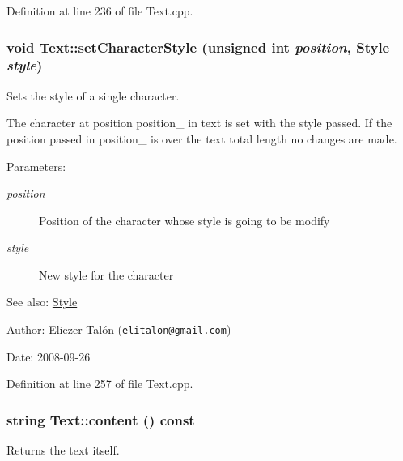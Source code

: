 Definition at line 236 of file Text.cpp.\hypertarget{class_text_7cf2efca7fdd4d7b04292e373d5c2e5e}{
\subsubsection[setCharacterStyle]{\setlength{\rightskip}{0pt plus 5cm}void Text::setCharacterStyle (unsigned int {\em position}, \/  {\bf Style} {\em style})}}
\label{class_text_7cf2efca7fdd4d7b04292e373d5c2e5e}


Sets the style of a single character. 

The character at position position\_\- in text is set with the style passed. If the position passed in position\_\- is over the text total length no changes are made.

\begin{Desc}
\item[Parameters:]
\begin{description}
\item[{\em position}]Position of the character whose style is going to be modify \item[{\em style}]New style for the character\end{description}
\end{Desc}
\begin{Desc}
\item[See also:]\hyperlink{class_style}{Style}\end{Desc}
\begin{Desc}
\item[Author:]Eliezer Talón (\href{mailto:elitalon@gmail.com}{\tt elitalon@gmail.com}) \end{Desc}
\begin{Desc}
\item[Date:]2008-09-26 \end{Desc}


Definition at line 257 of file Text.cpp.\hypertarget{class_text_8a29bbf6c707ac8b2055a22723a82f3d}{
\subsubsection[content]{\setlength{\rightskip}{0pt plus 5cm}string Text::content () const}}
\label{class_text_8a29bbf6c707ac8b2055a22723a82f3d}


Returns the text itself. 

